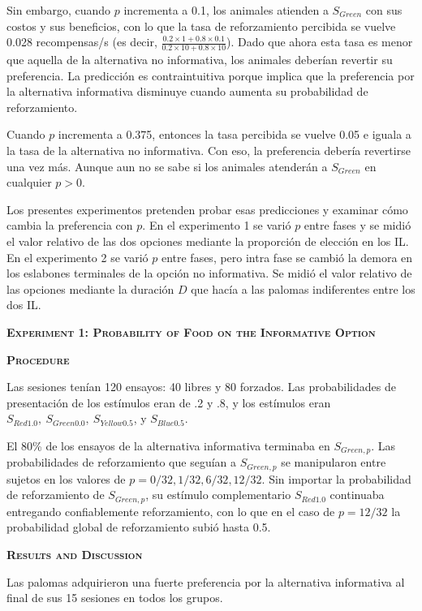 \documentclass[a4paper,12pt]{article}
\begin{document}
Sin embargo, cuando $p$ incrementa a 0.1, los animales atienden a $S_{Green}$ con sus costos y sus beneficios, con lo que la tasa de reforzamiento percibida se vuelve 0.028 recompensas/s (es decir, $\frac{0.2\times1+0.8\times0.1}{0.2\times10+0.8\times10}$). Dado que ahora esta tasa es menor que aquella de la alternativa no informativa, los animales deberían revertir su preferencia. La predicción es contraintuitiva porque implica que la preferencia por la alternativa informativa disminuye cuando aumenta su probabilidad de reforzamiento.

Cuando $p$ incrementa a 0.375, entonces la tasa percibida se vuelve 0.05 e iguala a la tasa de la alternativa no informativa. Con eso, la preferencia debería revertirse una vez más. Aunque aun no se sabe si los animales atenderán a $S_{Green}$ en cualquier $p > 0$.

Los presentes experimentos pretenden probar esas predicciones y examinar cómo cambia la preferencia con $p$. En el experimento 1 se varió $p$ entre fases y se midió el valor relativo de las dos opciones mediante la proporción de elección en los IL. En el experimento 2 se varió $p$ entre fases, pero intra fase se cambió la demora en los eslabones terminales de la opción no informativa. Se midió el valor relativo de las opciones mediante la duración $D$ que hacía a las palomas indiferentes entre los dos IL.

{\scshape\bfseries Experiment 1: Probability of Food on the Informative Option}

{\scshape\bfseries Procedure}

Las sesiones tenían 120 ensayos: 40 libres y 80 forzados. Las probabilidades de presentación de los estímulos eran de .2 y .8, y los estímulos eran $S_{Red1{.}0},\ S_{Green0{.}0},\ S_{Yellow0{.}5}$, y $S_{Blue0{.}5}$. 

El 80\% de los ensayos de la alternativa informativa terminaba en $S_{Green,p}$. Las probabilidades de reforzamiento que seguían a $S_{Green,p}$ se manipularon entre sujetos en los valores de $p = 0/32, 1/32, 6/32, 12/32$. Sin importar la probabilidad de reforzamiento de $S_{Green,p}$, su estímulo complementario $S_{Red1{.}0}$ continuaba entregando confiablemente reforzamiento, con lo que en el caso de $p= 12/32$ la probabilidad global de reforzamiento subió hasta 0.5. 

{\scshape\bfseries Results and Discussion}

Las palomas adquirieron una fuerte preferencia por la alternativa informativa al final de sus 15 sesiones en todos los grupos.
\end{document}
